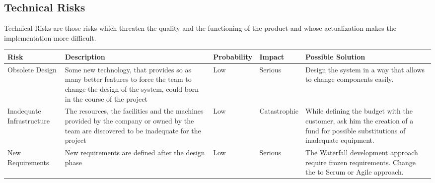 \subsection{Technical Risks}
Technical Risks are those risks which threaten the quality and the functioning of the product and whose actualization makes the implementation more difficult. \newline
\begin{adjustbox}{max width=\textwidth}
\begin{tabular}{|l|p{5 cm}|l|l|p{5cm}|}
\hline
Risk & Description & Probability & Impact & Possible Solution
\\ \hline
Obsolete Design & Some new technology, that provides so as many better features to force the team to change the design of the system, could born in the course of the project & Low & Serious & Design the system in a way that allows to change components easily.
\\ \hline
Inadequate Infrastructure & The resources, the facilities and the machines provided by the company or owned by the team are discovered to be inadequate for the project & Low & Catastrophic & While defining the budget with the customer, ask him the creation of a fund for possible substitutions of inadequate equipment.
\\ \hline
New Requirements & New requirements are defined after the design phase& Low & Serious &The Waterfall development approach require frozen requirements. Change the to Scrum or Agile approach.

\\ \hline
\end{tabular}
\end{adjustbox}
